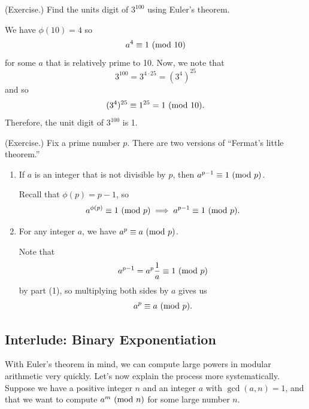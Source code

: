 \documentclass[letterpaper]{article}
\begin{document}
\begin{mdframed}
    (Exercise.) Find the units digit of $3^{100}$ using Euler's theorem.

    \begin{mdframed}
        We have $\phi(10) = 4$ so 
        \[a^{4} \equiv 1 \ (\mathrm{mod}\ 10)\]
        for some $a$ that is relatively prime to 10. Now, we note that 
        \[3^{100} = 3^{4 \cdot 25} = (3^4)^{25}\]
        and so 
        \[(3^4)^{25} \equiv 1^{25} = 1 \ (\mathrm{mod}\ 10).\]
        Therefore, the unit digit of $3^{100}$ is 1.
    \end{mdframed}
\end{mdframed}

\begin{mdframed}
    (Exercise.) Fix a prime number $p$. There are two versions of ``Fermat's little theorem.''
    \begin{enumerate}
        \item If $a$ is an integer that is not divisible by $p$, then $a^{p - 1} \equiv 1 \ (\mathrm{mod}\ p)$. 
        
        \begin{mdframed}
            Recall that $\phi(p) = p - 1$, so 
            \[a^{\phi(p)} \equiv 1 \ (\mathrm{mod}\ p) \implies a^{p - 1} \equiv 1 \ (\mathrm{mod}\ p).\]
        \end{mdframed}

        \item For any integer $a$, we have $a^p \equiv a \ (\mathrm{mod}\ p)$. 
        
        \begin{mdframed}
            Note that 
            \[a^{p - 1} = a^p \frac{1}{a} \equiv 1 \ (\mathrm{mod}\ p)\]
            by part (1), so multiplying both sides by $a$ gives us 
            \[a^p \equiv a \ (\mathrm{mod}\ p).\]
        \end{mdframed}
    \end{enumerate}
\end{mdframed}


\subsection{Interlude: Binary Exponentiation}
With Euler's theorem in mind, we can compute large powers in modular arithmetic very quickly. Let's now explain the process more systematically. Suppose we have a positive integer $n$ and an integer $a$ with $\gcd(a, n) = 1$, and that we want to compute $a^m \ (\mathrm{mod}\ n)$ for some large number $n$.

\bigskip 
\end{document}
